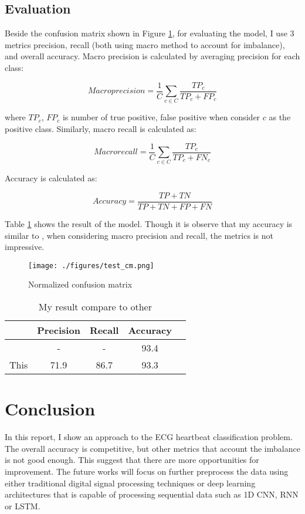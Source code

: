 \documentclass[conference]{IEEEtran}
\begin{document}
	
	\subsection{Evaluation}
	Beside the confusion matrix shown in Figure \ref{test_cm}, for evaluating the model, I use 3 metrics precision, recall (both using macro method to account for imbalance), and overall accuracy. Macro precision is calculated by averaging precision for each class: 
	
	\[ Macro precision = \frac{1}{C} \sum_{c \in C} \frac{TP_c}{TP_c + FP_c} \]
	
	where $TP_c$, $FP_c$ is number of true positive, false positive when consider $c$ as the positive class.  Similarly, macro recall is calculated as: 
	
	\[  Macro recall = \frac{1}{C} \sum_{c \in C} \frac{TP_c}{TP_c + FN_c} \]
	
	Accuracy is calculated as: 
	
	\[ Accuracy = \frac{TP + TN}{TP + TN + FP + FN} \]
	
	Table \ref{tab:result} shows the result of the model. Though it is observe that my accuracy is similar to \cite{kachuee}, when considering macro precision and recall, the metrics is not impressive. 
	
	\begin{figure}
		\label{test_cm}
		\texttt{[image: ./figures/test\_cm.png]}
		\caption{Normalized confusion matrix}
	\end{figure}
	
	\begin{table}[h]
		\centering
		\label{tab:result}
		\caption{My result compare to other}
		\begin{tabular}{|c|c|c|c|c|}
			\hline
				& Precision & Recall & Accuracy \\
			\hline
			\cite{kachuee} & - & - & 93.4 \\
			This  & 71.9 & 86.7 & 93.3 \\
			\hline
		\end{tabular}
	\end{table}
	
	
	
	\section{Conclusion}
	In this report, I show an approach to the ECG heartbeat classification problem. The overall accuracy is competitive, but other metrics that account the imbalance is not good enough. This suggest that there are more opportunities for improvement. The future works will focus on further preprocess the data using either traditional digital signal processing techniques or deep learning architectures that is capable of processing sequential data such as 1D CNN, RNN or LSTM. 
\end{document}
